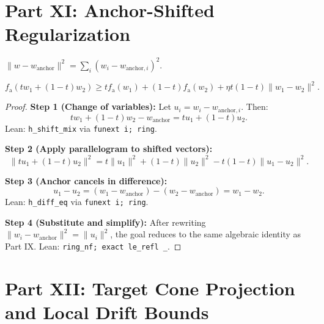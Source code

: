 \section{Part XI: Anchor-Shifted Regularization}
\label{app:anchor}

\begin{definition}
$\|w - w_{\mathrm{anchor}}\|^2 = \sum_i (w_i - w_{\mathrm{anchor},i})^2$.
\end{definition}

\begin{theorem}
\begin{equation}
    f_{\mathrm{a}}(tw_1 + (1{-}t)w_2) \ge tf_{\mathrm{a}}(w_1) + (1{-}t)f_{\mathrm{a}}(w_2) + \eta t(1{-}t)\|w_1 - w_2\|^2.
\end{equation}
\end{theorem}
\begin{proof}
\textbf{Step 1 (Change of variables):} Let $u_i = w_i - w_{\mathrm{anchor},i}$.  Then:
\begin{equation}
    tw_1 + (1{-}t)w_2 - w_{\mathrm{anchor}} = tu_1 + (1{-}t)u_2.
\end{equation}
Lean: \texttt{h\_shift\_mix} via \texttt{funext i; ring}.

\textbf{Step 2 (Apply parallelogram to shifted vectors):}
\begin{equation}
    \|tu_1 + (1{-}t)u_2\|^2 = t\|u_1\|^2 + (1{-}t)\|u_2\|^2 - t(1{-}t)\|u_1 - u_2\|^2.
\end{equation}

\textbf{Step 3 (Anchor cancels in difference):}
\begin{equation}
    u_1 - u_2 = (w_1 - w_{\mathrm{anchor}}) - (w_2 - w_{\mathrm{anchor}}) = w_1 - w_2.
\end{equation}
Lean: \texttt{h\_diff\_eq} via \texttt{funext i; ring}.

\textbf{Step 4 (Substitute and simplify):} After rewriting $\|w_i - w_{\mathrm{anchor}}\|^2 = \|u_i\|^2$, the goal reduces to the same algebraic identity as Part IX.  Lean: \texttt{ring\_nf; exact le\_refl \_}.
\end{proof}


\section{Part XII: Target Cone Projection and Local Drift Bounds}
\label{app:target_cone}

